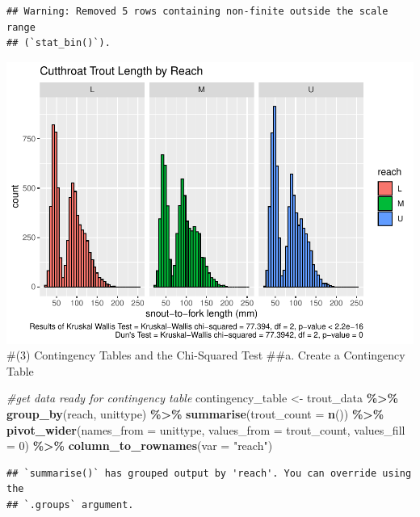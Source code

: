 \documentclass[
]{article}
\newenvironment{Shaded}{\begin{snugshade}}{\end{snugshade}}
\newcommand{\AttributeTok}[1]{\textcolor[rgb]{0.13,0.29,0.53}{#1}}
\newcommand{\CommentTok}[1]{\textcolor[rgb]{0.56,0.35,0.01}{\textit{#1}}}
\newcommand{\DecValTok}[1]{\textcolor[rgb]{0.00,0.00,0.81}{#1}}
\newcommand{\FunctionTok}[1]{\textcolor[rgb]{0.13,0.29,0.53}{\textbf{#1}}}
\newcommand{\NormalTok}[1]{#1}
\newcommand{\OtherTok}[1]{\textcolor[rgb]{0.56,0.35,0.01}{#1}}
\newcommand{\SpecialCharTok}[1]{\textcolor[rgb]{0.81,0.36,0.00}{\textbf{#1}}}
\newcommand{\StringTok}[1]{\textcolor[rgb]{0.31,0.60,0.02}{#1}}
\begin{document}
\begin{verbatim}
## Warning: Removed 5 rows containing non-finite outside the scale range
## (`stat_bin()`).
\end{verbatim}

\includegraphics{Lab7_Summer.Heschong_files/figure-latex/vis results-1.pdf}
\#(3) Contingency Tables and the Chi-Squared Test \#\#a. Create a
Contingency Table

\begin{Shaded}
\begin{Highlighting}[]
\CommentTok{\#get data ready for contingency table}
\NormalTok{contingency\_table }\OtherTok{\textless{}{-}}\NormalTok{ trout\_data }\SpecialCharTok{\%\textgreater{}\%}
  \FunctionTok{group\_by}\NormalTok{(reach, unittype) }\SpecialCharTok{\%\textgreater{}\%}
  \FunctionTok{summarise}\NormalTok{(}\AttributeTok{trout\_count =} \FunctionTok{n}\NormalTok{()) }\SpecialCharTok{\%\textgreater{}\%}
  \FunctionTok{pivot\_wider}\NormalTok{(}\AttributeTok{names\_from =}\NormalTok{ unittype, }\AttributeTok{values\_from =}\NormalTok{ trout\_count, }\AttributeTok{values\_fill =} \DecValTok{0}\NormalTok{) }\SpecialCharTok{\%\textgreater{}\%}
  \FunctionTok{column\_to\_rownames}\NormalTok{(}\AttributeTok{var =} \StringTok{"reach"}\NormalTok{)}
\end{Highlighting}
\end{Shaded}

\begin{verbatim}
## `summarise()` has grouped output by 'reach'. You can override using the
## `.groups` argument.
\end{verbatim}
\end{document}
